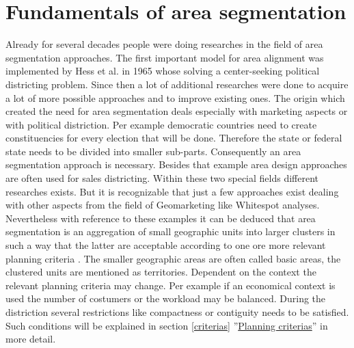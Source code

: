 \section{Fundamentals of area segmentation}\label{Fundamentals}

Already for several decades people were doing researches in the field of area segmentation approaches. The first important model for area alignment was implemented by Hess et al. \cite{hess} in 1965 whose solving a center-seeking political districting problem. Since then a lot of additional researches were done to acquire a lot of more possible approaches and to improve existing ones. The origin which created the need for area segmentation deals especially with marketing aspects or with political distriction. Per example democratic countries need to create constituencies for every election that will be done. Therefore the state or federal state needs to be divided into smaller sub-parts. Consequently an area segmentation approach is necessary. Besides that example area design approaches are often used for sales districting. Within these two special fields different researches exists. But it is recognizable that just a few approaches exist dealing with other aspects from the field of Geomarketing like Whitespot analyses. Nevertheless with reference to these examples it can be deduced that area segmentation is an aggregation of small geographic units into larger clusters in such a way that the latter are acceptable according to one ore more relevant planning criteria \cite{kalcsics, zoltner}. The smaller geographic areas are often called basic areas, the clustered units are mentioned as territories. Dependent on the context the relevant planning criteria may change. Per example if an economical context is used the number of costumers or the workload may be balanced. During the distriction several restrictions like compactness or contiguity needs to be satisfied. Such conditions will be explained in section \ref{criterias} ''\hyperref[criterias]{Planning criterias}'' in more detail. \\
